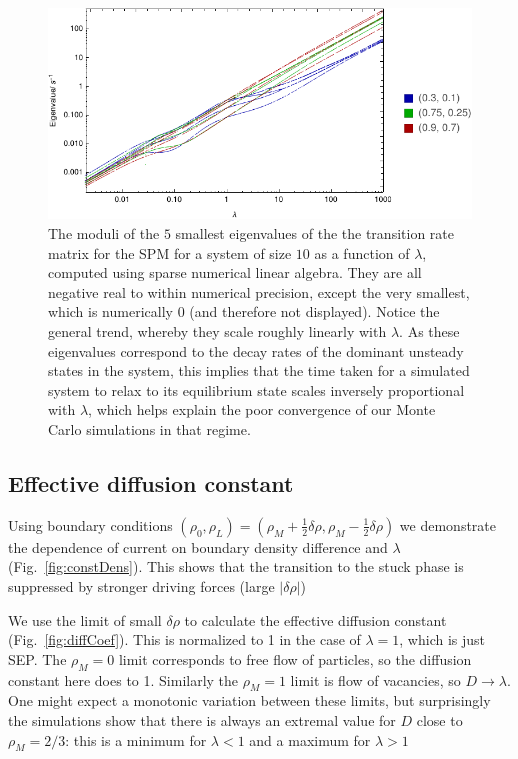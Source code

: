 \documentclass[
reprint, amsmath,amssymb,
]{revtex4-1}
\begin{document}
\begin{figure}[h!]
\vspace{0em}
\begin{center}
    \includegraphics[width=1\linewidth]{eigenspectrumGoodRange}
\end{center}
    \vspace{-0em}
\caption{\label{fig:eigenspec} The moduli of the $5$ smallest eigenvalues of the the transition rate matrix for the SPM for a system of size $10$ as a function of $\lambda$, computed using sparse numerical linear algebra.
They are all negative real to within numerical precision,
except the very smallest, which is numerically $0$ (and therefore not displayed). Notice the general trend, whereby they scale roughly linearly with $\lambda$. As these eigenvalues correspond to the decay rates
of the dominant unsteady states in the system, this implies that the time taken for a simulated system to relax
to its equilibrium state scales inversely proportional with $\lambda$, which helps explain the poor convergence of our Monte Carlo simulations in that regime.}
\end{figure}

\subsection{Effective diffusion constant}


Using boundary conditions $(\rho_0, \rho_L) = (\rho_M + \frac{1}{2}
\delta\rho, \rho_M - \frac{1}{2} \delta\rho)$ we demonstrate the
dependence of current on boundary density difference and $\lambda$ (Fig.~\ref{fig:constDens}).  This
shows that the transition to the stuck phase is suppressed by stronger
driving forces (large $|\delta\rho|$)

We use the limit of small $\delta\rho$ to calculate the effective
diffusion constant (Fig.~\ref{fig:diffCoef}).  This is normalized to 1 in the case of
$\lambda=1$, which is just SEP.  The $\rho_M=0$ limit corresponds to
free flow of particles, so the diffusion constant here does to
1. Similarly the $\rho_M=1$ limit is flow of vacancies, so
$D\rightarrow\lambda$.  One might expect a monotonic variation between
these limits, but surprisingly the simulations show that there is
always an extremal value for $D$ close to $\rho_M=2/3$: this is a
minimum for $\lambda<1$ and a maximum for $\lambda>1$
\end{document}
